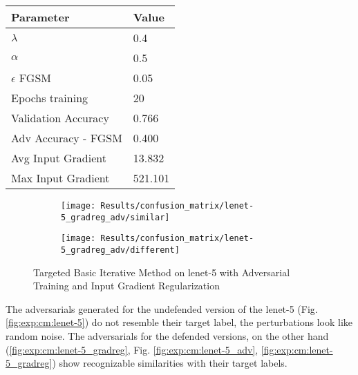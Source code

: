 \documentclass[draft,final]{vutinfth} %
\begin{document}
\begin{table}[h]
  \centering
  \begin{tabular}{ll}
    \toprule
			Parameter			& Value   \\
    \midrule
			$\lambda$								& 0.4			\\
			$\alpha$								& 0.5			\\
			$\epsilon$ FGSM					& 0.05		\\
			Epochs training					& 20			\\
			
			Validation Accuracy			& 0.766		\\ 
			Adv Accuracy - FGSM			& 0.400		\\
			
			Avg Input Gradient			& 13.832	\\
			Max Input Gradient			& 521.101	\\
    \bottomrule
  \end{tabular}
\end{table}


\begin{figure}[h]
  \begin{subfigure}[b]{0.5\columnwidth}
		\centering
    \texttt{[image: Results/confusion\_matrix/lenet-5\_gradreg\_adv/similar]}
    \label{fig:exp:cm:lenet-5_gradreg_adv:similar}
  \end{subfigure}
  \begin{subfigure}[b]{0.5\columnwidth}
		\centering
    \texttt{[image: Results/confusion\_matrix/lenet-5\_gradreg\_adv/different]}
    \label{fig:exp:cm:lenet-5_gradreg_adv:different}
  \end{subfigure}
  \caption{Targeted Basic Iterative Method on lenet-5 with Adversarial Training and Input Gradient Regularization}
  \label{fig:exp:cm:lenet-5_gradreg_adv}
\end{figure}

The adversarials generated for the undefended version of the lenet-5 (Fig. \ref{fig:exp:cm:lenet-5}) do not resemble their target label, the perturbations look like random noise.
The adversarials for the defended versions, on the other hand (\ref{fig:exp:cm:lenet-5_gradreg}, Fig. \ref{fig:exp:cm:lenet-5_adv}, \ref{fig:exp:cm:lenet-5_gradreg}) show recognizable similarities with their target labels.

\clearpage
\end{document}
